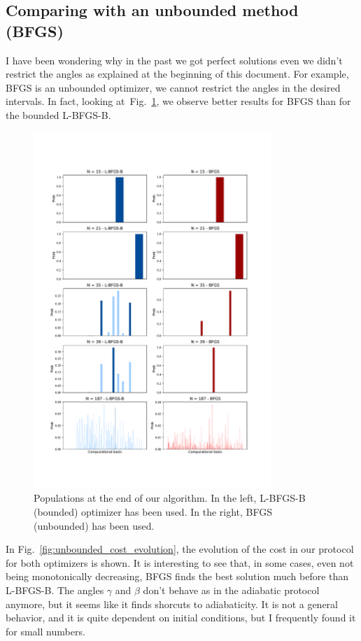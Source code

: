 \documentclass[12pt, letterpaper]{article}
\begin{document}
\subsection{Comparing with an unbounded method (BFGS)}
I have been wondering why in the past we got perfect solutions even we didn't restrict
the angles as explained at the beginning of this document. For example, BFGS is an unbounded
optimizer, we cannot restrict the angles in the desired intervals.
In fact, looking at~Fig.~\ref{fig:unbounded_pops}, we observe better results for BFGS than
for the bounded L-BFGS-B.

\begin{figure}[h]
    \centering
    \includegraphics[width=0.8\textwidth]{unbounded_populations.pdf}
    \caption{Populations at the end of our algorithm. In the left,
    L-BFGS-B (bounded) optimizer has been used. In the right, BFGS (unbounded) has been used.}
    \label{fig:unbounded_pops}
\end{figure}

In Fig.~\ref{fig:unbounded_cost_evolution}, the evolution of the cost in our protocol for both optimizers is shown.
It is interesting to see that, in some cases, even not being monotonically decreasing, BFGS
finds the best solution much before than L-BFGS-B. The angles $\gamma$ and $\beta$ don't
behave as in the adiabatic protocol anymore, but it seems like it finds shorcuts to adiabaticity.
It is not a general behavior, and it is quite dependent on initial conditions, but
I frequently found it for small numbers.
\end{document}
